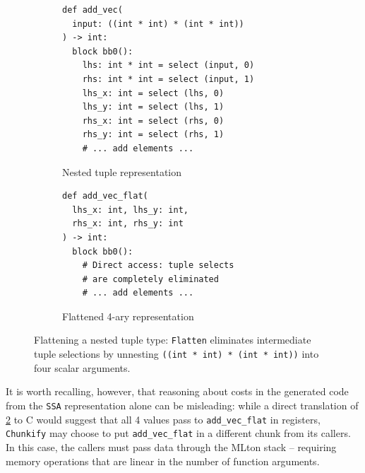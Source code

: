 \begin{figure}[htbp]
  \centering
  \begin{subfigure}[t]{0.48\textwidth}
    \caption{Nested tuple representation}
    \label{fig:nested_tuple_unflattened}
    \vspace{1mm}
\begin{verbatim}
def add_vec(
  input: ((int * int) * (int * int))
) -> int:
  block bb0():
    lhs: int * int = select (input, 0)
    rhs: int * int = select (input, 1)
    lhs_x: int = select (lhs, 0)
    lhs_y: int = select (lhs, 1)
    rhs_x: int = select (rhs, 0)
    rhs_y: int = select (rhs, 1)
    # ... add elements ...
\end{verbatim}
  \end{subfigure}\hfill
  \begin{subfigure}[t]{0.48\textwidth}
    \caption{Flattened 4-ary representation}
    \label{fig:nested_tuple_flattened}
    \vspace{1mm}
\begin{verbatim}
def add_vec_flat(
  lhs_x: int, lhs_y: int,
  rhs_x: int, rhs_y: int
) -> int:
  block bb0():
    # Direct access: tuple selects
    # are completely eliminated
    # ... add elements ...
\end{verbatim}
  \end{subfigure}
  \caption{Flattening a nested tuple type: \texttt{Flatten} eliminates intermediate tuple selections by unnesting \texttt{((int * int) * (int * int))} into four scalar arguments.}
  \label{fig:nested_tuple_flatten}
\end{figure}

It is worth recalling, however, that reasoning about costs in the generated code
from the \texttt{SSA} representation alone can be misleading: while a direct
translation of \cref{fig:nested_tuple_flattened} to C would suggest that all
4 values pass to \texttt{add\_vec\_flat} in registers, \texttt{Chunkify} may
choose to put \texttt{add\_vec\_flat} in a different chunk from its callers. In
this case, the callers must pass data through the MLton stack -- requiring
memory operations that are linear in the number of function arguments.

